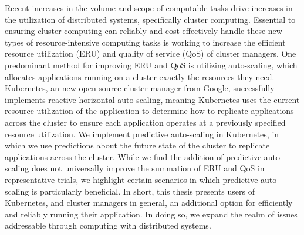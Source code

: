 Recent increases in the volume and scope of computable tasks drive increases in
the utilization of distributed systems, specifically cluster computing.
Essential to ensuring cluster computing can reliably and cost-effectively handle
these new types of resource-intensive computing tasks is working to increase the
efficient resource utilization (ERU) and quality of service (QoS) of cluster
managers. One predominant method for improving ERU and QoS is utilizing
auto-scaling, which allocates applications running on a cluster exactly the
resources they need. Kubernetes, an new open-source cluster manager from
Google, successfully implements reactive horizontal auto-scaling, meaning
Kubernetes uses the current resource utilization of
the application to determine how to
replicate applications across the cluster to ensure each application operates
at a previously specified resource utilization. We implement predictive
auto-scaling in Kubernetes, in which we use predictions about the future state
of the cluster to replicate applications across the cluster. While we find
the addition of predictive auto-scaling does not universally improve the
summation of ERU and QoS in representative trials, we highlight certain
scenarios in which predictive auto-scaling is particularly beneficial. In short,
this thesis presents users of Kubernetes, and cluster managers in general, an
additional option for efficiently and reliably running their application. In
doing so, we expand the realm of issues addressable through computing with
distributed systems.
